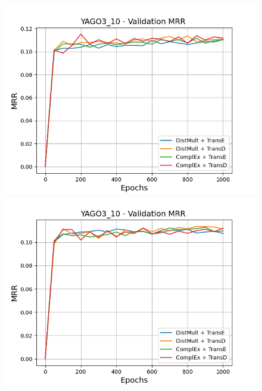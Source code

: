 \clearpage
\begin{figure}[H]
    \centering
    \begin{minipage}{.45\textwidth}
      \centering
      \includegraphics[width=0.9\linewidth]{figures/results/gan_train/not_pretrained/uncertainty/max_distribution/entropy/yago3_10/1k_epochs/uncertainty_yago3_10_mrrs.png}
    \end{minipage}%
    \begin{minipage}{.45\textwidth}
      \centering
      \includegraphics[width=0.9\linewidth]{figures/results/gan_train/not_pretrained/uncertainty/max_distribution/least_confidence/yago3_10/uncertainty_yago3_10_mrrs.png}
    \end{minipage}
    \begin{minipage}{.45\textwidth}
      \centering

\end{minipage}
\end{figure}
